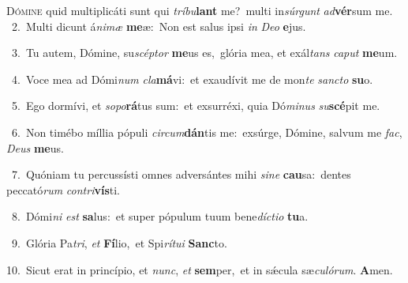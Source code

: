 \lettrine{\initial\textcolor{\initialcolor}{D}}{ómine} quid multiplicáti sunt qui \textit{trí}\-\textit{bu}\textbf{lant} me?~\star multi in\-\textit{súr}\-\textit{gunt} \textit{ad}\-\textbf{vér}sum me.\\
{\numbfont\textcolor{\numbcolor}{~2.}}~Multi dicunt á\-\textit{ni}\-\textit{mæ} \textbf{me}\-æ:~\star Non est salus ipsi \textit{in} \textit{De}\-\textit{o} \textbf{e}\-jus.\par
{\numbfont\textcolor{\numbcolor}{~3.}}~Tu autem, Dómine, su\-\textit{scép}\-\textit{tor} \textbf{me}\-us es,~\star glória mea, et exál\textit{tans} \textit{ca}\-\textit{put} \textbf{me}\-um.\par
{\numbfont\textcolor{\numbcolor}{~4.}}~Voce mea ad Dómi\textit{num} \textit{cla}\-\textbf{má}vi:~\star et exaudívit me de mon\textit{te} \textit{sanc}\-\textit{to} \textbf{su}\-o.\par
{\numbfont\textcolor{\numbcolor}{~5.}}~Ego dormívi, et \textit{so}\-\textit{po}\textbf{rá}tus sum:~\star et exsurréxi, quia Dó\-\textit{mi}\-\textit{nus} \textit{su}\-\textbf{scé}pit me.\par
{\numbfont\textcolor{\numbcolor}{~6.}}~Non timébo míllia pópuli \textit{cir}\-\textit{cum}\textbf{dán}tis me:~\star exsúrge, Dómine, salvum me \textit{fac}\-, \textit{De}\-\textit{us} \textbf{me}\-us.\par
{\numbfont\textcolor{\numbcolor}{~7.}}~Quóniam tu percussísti omnes adversántes mihi \textit{si}\-\textit{ne} \textbf{cau}\-sa:~\star dentes peccató\textit{rum} \textit{con}\-\textit{tri}\textbf{vís}ti.\par
{\numbfont\textcolor{\numbcolor}{~8.}}~Dómi\textit{ni} \textit{est} \textbf{sa}\-lus:~\star et super pópulum tuum bene\-\textit{díc}\-\textit{ti}\textit{o} \textbf{tu}\-a.\par
{\numbfont\textcolor{\numbcolor}{~9.}}~Glória Pa\-\textit{tri}\-, \textit{et} \textbf{Fí}\-lio,~\star et Spi\-\textit{rí}\-\textit{tu}\textit{i} \textbf{Sanc}\-to.\par
{\numbfont\textcolor{\numbcolor}{10.}}~Sicut erat in princípio, et \textit{nunc}\-, \textit{et} \textbf{sem}\-per,~\star et in sǽcula sæ\-\textit{cu}\-\textit{ló}\textit{rum}. \textbf{A}\-men.\par
